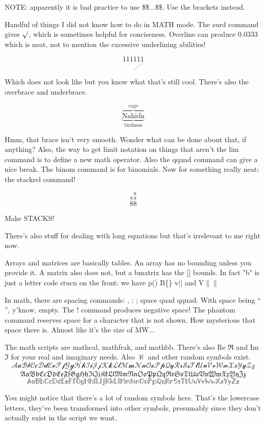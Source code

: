 \documentclass{article}
\begin{document}
NOTE: apparently it is bad practice to use \$\$...\$\$. Use the brackets instead.

Handful of things I did not know how to do in MATH mode. The surd command gives $\surd$, which is sometimes helpful for conciseness. Overline can produce $0.0\overline{333}$ which is neat, not to mention the excessive underlining abilities!

\[ 1\underline{1\underline{ 1\underline{1\underline{ 1\underline{1}}}}} \]

Which does not look like but you know what that's still cool. There's also the overbrace and underbrace.

\[ \underbrace{\overbrace{\text{Nahida}}^{\text{cage}}}_{\text{birdness}} \]

Hmm, that brace isn't very smooth. Wonder what can be done about that, if anything? Also, the way to get limit notation on things that aren't the lim command is to define a new math operator. Also the qquad command can give a nice break. The binom command is for binomials. Now for something really neat: the stackrel command!

\[ \stackrel{8}{8} \stackrel{8}{\stackrel{8}{8}} \]

Make STACKS! 

There's also stuff for dealing with long equations but that's irrelevant to me right now. 

Arrays and matrices are basically tables. An array has no bounding unless you provide it. A matrix also does not, but a bmatrix has the [] bounds. In fact "b" is just a letter code stucn on the front: we have p() B\{\} v$||$ and V$\parallel\parallel$

In math, there are spacing commands: , : ; space quad qquad. With space being `` '', y'know, empty. The ! command produces negative space! The phantom command reserves space for a character that is not shown. \phantom{MW} How mysterious that space there is. Almost like it's the size of MW...

The math scripts are mathcal, mathfrak, and mathbb. There's also Re $\Re$ and Im $\Im$ for your real and imaginary needs. Also $\aleph$ and other random symbols exist. 
\[ \mathcal{AaBbCcDdEeFfGgHhIiJjKkLlMmNnOoPpQqRrSsTtUuVvWwXxYyZz}\]
\[ \mathfrak{AaBbCcDdEeFfGgHhIiJjKkLlMmNnOoPpQqRrSsTtUuVvWwXxYyZz}\]
\[ \mathbb{AaBbCcDdEeFfGgHhIiJjKkLlMmNnOoPpQqRrSsTtUuVvWwXxYyZz}\]


You might notice that there's a lot of random symbols here. That's the lowercase letters, they've been transformed into other symbols, presumably since they don't actually exist in the script we want.
\end{document}
